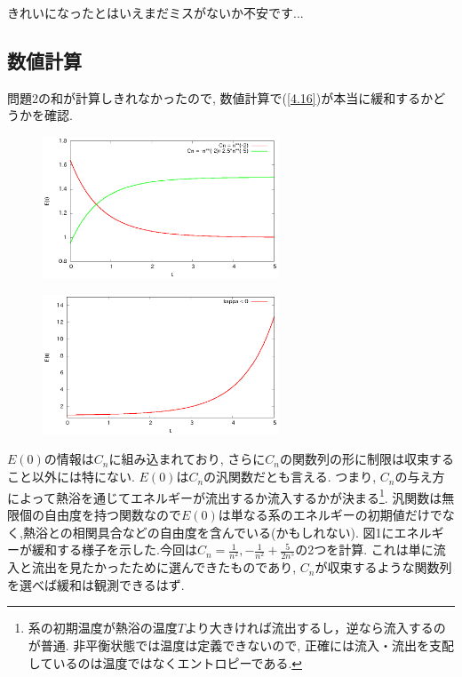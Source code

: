\documentclass[10.5pt,a4paper]{jreport}
\begin{document}
きれいになったとはいえまだミスがないか不安です...
\subsection{数値計算}
問題2の和が計算しきれなかったので, 数値計算で(\ref{4.16})が本当に緩和するかどうかを確認.
\begin{figure}[htbp]
  \begin{minipage}{0.5\hsize}
    \centering
    \includegraphics[width = 7cm]{./EPS/neq_fig1.eps}
    \label{fig1}
  \end{minipage}
  \begin{minipage}{0.5\hsize}
    \centering
    \includegraphics[width = 7cm]{./EPS/neq_fig2.eps}
    \label{fig2}
  \end{minipage}
\end{figure}
$E(0)$の情報は$C_n$に組み込まれており, さらに$C_n$の関数列の形に制限は収束すること以外には特にない. $E(0)$は$C_n$の汎関数だとも言える. つまり, $C_n$の与え方によって熱浴を通じてエネルギーが流出するか流入するかが決まる\footnote{系の初期温度が熱浴の温度$T$より大きければ流出するし，逆なら流入するのが普通. 非平衡状態では温度は定義できないので, 正確には流入・流出を支配しているのは温度ではなくエントロピーである.}. 汎関数は無限個の自由度を持つ関数なので$E(0)$は単なる系のエネルギーの初期値だけでなく,熱浴との相関具合などの自由度を含んでいる(かもしれない). 図1にエネルギーが緩和する様子を示した.今回は$C_n = \frac{1}{n^2}, -\frac{1}{n^2} + \frac{5}{2n^5}$の2つを計算. これは単に流入と流出を見たかったために選んできたものであり, $C_n$が収束するような関数列を選べば緩和は観測できるはず.
\end{document}
